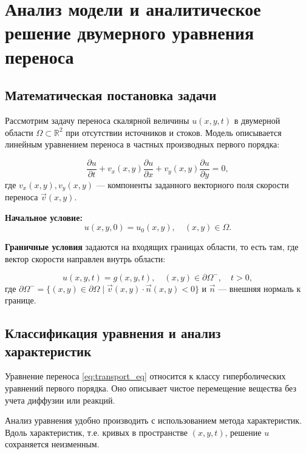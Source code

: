 \chapter{Анализ модели и аналитическое решение двумерного уравнения переноса}

\section{Математическая постановка задачи}

Рассмотрим задачу переноса скалярной величины $u(x, y, t)$ в двумерной области $\Omega \subset \mathbb{R}^2$ при отсутствии источников и стоков. Модель описывается линейным уравнением переноса  в частных производных первого порядка:

\begin{equation}
	\frac{\partial u}{\partial t} + v_x(x, y) \frac{\partial u}{\partial x} + v_y(x, y) \frac{\partial u}{\partial y} = 0,
	\label{eq:transport_eq}
\end{equation}
где $v_x(x, y), v_y(x, y)$ — компоненты заданного векторного поля скорости переноса $\vec{v}(x, y)$.

\textbf{Начальное условие:}
\begin{equation}
	u(x, y, 0) = u_0(x, y), \quad (x, y) \in \Omega.
	\label{eq:initial_condition}
\end{equation}

\textbf{Граничные условия} задаются на входящих границах области, то есть там, где вектор скорости направлен внутрь области:

\begin{equation}
	u(x, y, t) = g(x, y, t), \quad (x, y) \in \partial \Omega^{-}, \quad t > 0,
\end{equation}
где $\partial \Omega^{-} = \{ (x, y) \in \partial \Omega \mid \vec{v}(x, y) \cdot \vec{n}(x, y) < 0 \}$ и $\vec{n}$ — внешняя нормаль к границе.

\section{Классификация уравнения и анализ характеристик}

Уравнение переноса \eqref{eq:transport_eq} относится к классу гиперболических уравнений первого порядка. Оно описывает чистое перемещение вещества без учета диффузии или реакций.

Анализ уравнения удобно производить с использованием метода характеристик. Вдоль характеристик, т.е. кривых в пространстве $(x, y, t)$, решение $u$ сохраняется неизменным.

